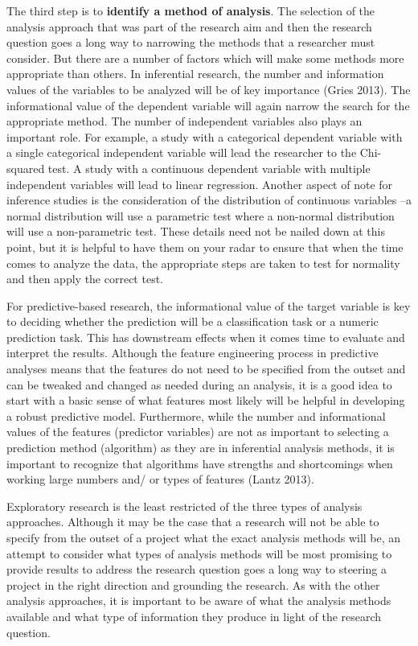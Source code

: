 \documentclass[
  letterpaper,
]{scrbook}
\begin{document}
The third step is to \textbf{identify a method of analysis}. The
selection of the analysis approach that was part of the research aim and
then the research question goes a long way to narrowing the methods that
a researcher must consider. But there are a number of factors which will
make some methods more appropriate than others. In inferential research,
the number and information values of the variables to be analyzed will
be of key importance (Gries 2013). The informational value of the
dependent variable will again narrow the search for the appropriate
method. The number of independent variables also plays an important
role. For example, a study with a categorical dependent variable with a
single categorical independent variable will lead the researcher to the
Chi-squared test. A study with a continuous dependent variable with
multiple independent variables will lead to linear regression. Another
aspect of note for inference studies is the consideration of the
distribution of continuous variables --a normal distribution will use a
parametric test where a non-normal distribution will use a
non-parametric test. These details need not be nailed down at this
point, but it is helpful to have them on your radar to ensure that when
the time comes to analyze the data, the appropriate steps are taken to
test for normality and then apply the correct test.

For predictive-based research, the informational value of the target
variable is key to deciding whether the prediction will be a
classification task or a numeric prediction task. This has downstream
effects when it comes time to evaluate and interpret the results.
Although the feature engineering process in predictive analyses means
that the features do not need to be specified from the outset and can be
tweaked and changed as needed during an analysis, it is a good idea to
start with a basic sense of what features most likely will be helpful in
developing a robust predictive model. Furthermore, while the number and
informational values of the features (predictor variables) are not as
important to selecting a prediction method (algorithm) as they are in
inferential analysis methods, it is important to recognize that
algorithms have strengths and shortcomings when working large numbers
and/ or types of features (Lantz 2013).

Exploratory research is the least restricted of the three types of
analysis approaches. Although it may be the case that a research will
not be able to specify from the outset of a project what the exact
analysis methods will be, an attempt to consider what types of analysis
methods will be most promising to provide results to address the
research question goes a long way to steering a project in the right
direction and grounding the research. As with the other analysis
approaches, it is important to be aware of what the analysis methods
available and what type of information they produce in light of the
research question.
\end{document}
